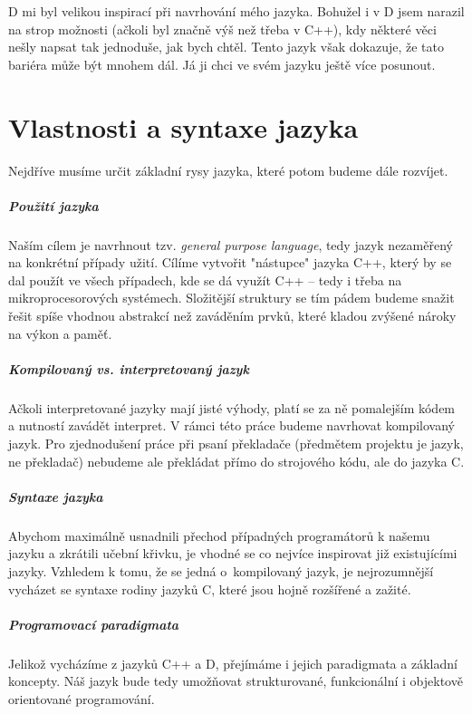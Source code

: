 D mi byl velikou inspirací při navrhování mého jazyka. Bohužel i v D jsem narazil na strop možnosti (ačkoli byl značně výš než třeba v C++), kdy některé věci nešly napsat tak jednoduše, jak bych chtěl. Tento jazyk však dokazuje, že tato bariéra může být mnohem dál. Já ji chci ve svém jazyku ještě více posunout. 

\chapter{Vlastnosti a syntaxe jazyka}
Nejdříve musíme určit základní rysy jazyka, které potom budeme dále rozvíjet.

\paragraph{Použití jazyka}
Naším cílem je navrhnout tzv. \textit{general purpose language}, tedy jazyk nezaměřený na konkrétní případy užití. Cílíme vytvořit "nástupce" jazyka C++, který by se dal použít ve všech případech, kde se dá využít C++ -- tedy i třeba na mikroprocesorových systémech. Složitější struktury se tím pádem budeme snažit řešit spíše vhodnou abstrakcí než zaváděním prvků, které kladou zvýšené nároky na výkon a paměť.

\paragraph{Kompilovaný vs. interpretovaný jazyk}
Ačkoli interpretované jazyky mají jisté výhody, platí se za ně pomalejším kódem a nutností zavádět interpret. V rámci této práce budeme navrhovat kompilovaný jazyk. Pro zjednodušení práce při psaní překladače (předmětem projektu je jazyk, ne překladač) nebudeme ale překládat přímo do strojového kódu, ale do jazyka C.

\paragraph{Syntaxe jazyka}
Abychom maximálně usnadnili přechod případných programátorů k našemu jazyku a zkrátili učební křivku, je vhodné se co nejvíce inspirovat již existujícími jazyky. Vzhledem k tomu, že se jedná o~kompilovaný jazyk, je nejrozumnější vycházet se syntaxe rodiny jazyků C, které jsou hojně rozšířené a zažité.

\paragraph{Programovací paradigmata}
Jelikož vycházíme z jazyků C++ a D, přejímáme i jejich paradigmata a základní koncepty. Náš jazyk bude tedy umožňovat strukturované, funkcionální i objektově orientované programování.


